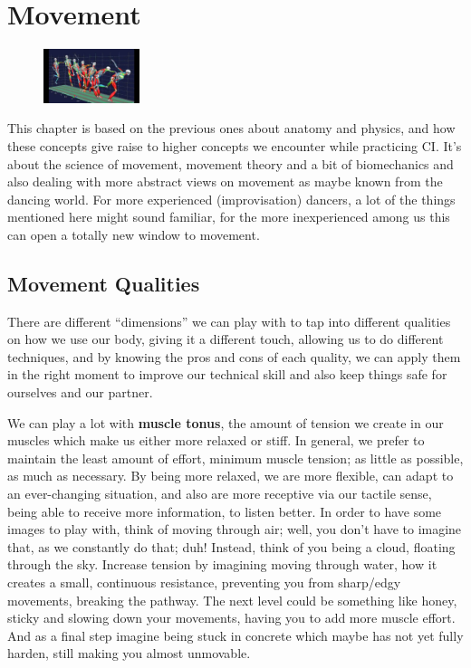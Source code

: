 \section{Movement}\label{sec:movement}

\begin{figure}
    \centering
    \includegraphics[width=0.25\textwidth]{images/movement}
\end{figure}

This chapter is based on the previous ones about anatomy and physics, and how these concepts give raise to higher concepts we encounter while practicing CI.
It's about the science of movement, movement theory and a bit of biomechanics and also dealing with more abstract views on movement as maybe known from the dancing world.
For more experienced (improvisation) dancers, a lot of the things mentioned here might sound familiar, for the more inexperienced among us this can open a totally new window to movement.

\subsection{Movement Qualities}\label{subsec:movement-qualities}

There are different ``dimensions'' we can play with to tap into different qualities on how we use our body, giving it a different touch, allowing us to do different techniques, and by knowing the pros and cons of each quality, we can apply them in the right moment to improve our technical skill and also keep things safe for ourselves and our partner.

We can play a lot with \textbf{muscle tonus}, the amount of tension we create in our muscles which make us either more relaxed or stiff.
In general, we prefer to maintain the least amount of effort, minimum muscle tension; as little as possible, as much as necessary.
By being more relaxed, we are more flexible, can adapt to an ever-changing situation, and also are more receptive via our tactile sense, being able to receive more information, to listen better.
In order to have some images to play with, think of moving through air; well, you don't have to imagine that, as we constantly do that; duh!
Instead, think of you being a cloud, floating through the sky.
Increase tension by imagining moving through water, how it creates a small, continuous resistance, preventing you from sharp/edgy movements, breaking the pathway.
The next level could be something like honey, sticky and slowing down your movements, having you to add more muscle effort.
And as a final step imagine being stuck in concrete which maybe has not yet fully harden, still making you almost unmovable.

